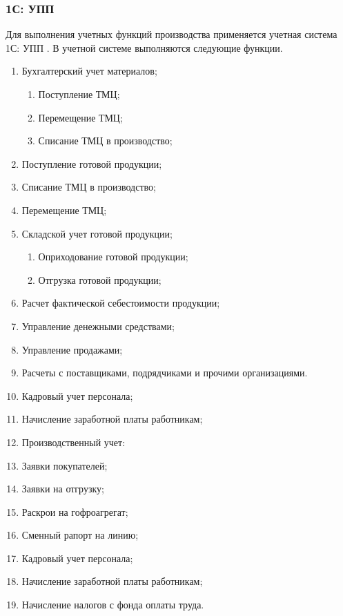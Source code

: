 \subsubsection{1С: УПП}


Для выполнения учетных функций производства применяется учетная система 1С: УПП . В учетной системе выполняются следующие функции.


\begin{enumerate}
\item Бухгалтерский учет материалов;
\begin{enumerate}
\item Поступление ТМЦ;
\item Перемещение ТМЦ;
\item Списание ТМЦ в производство;
\end{enumerate}
\item Поступление готовой продукции;
\item Списание ТМЦ в производство;
\item Перемещение ТМЦ;
\item Складской учет готовой продукции;
\begin{enumerate}
\item Оприходование готовой продукции;
\item Отгрузка готовой продукции;
\end{enumerate}
\item Расчет фактической себестоимости продукции;
\item Управление денежными средствами;
\item Управление продажами;
\item Расчеты с поставщиками, подрядчиками и прочими организациями.
\item Кадровый учет персонала;
\item Начисление заработной платы работникам;
 \item Производственный учет:
\item Заявки покупателей;
\item Заявки на отгрузку;
\item Раскрои на гофроагрегат;
 \item Сменный рапорт на линию;

\item Кадровый учет персонала;
\item Начисление заработной платы работникам;
\item Начисление налогов с фонда оплаты труда.
\end{enumerate}
